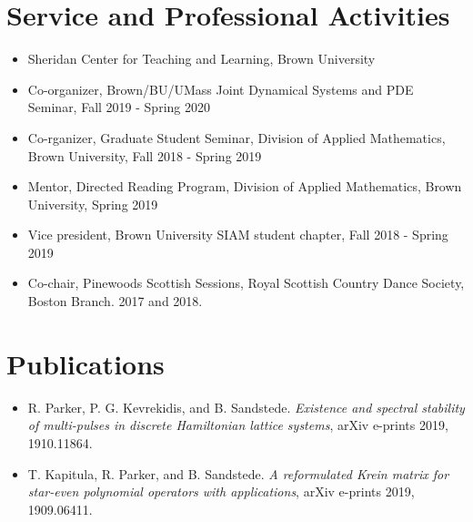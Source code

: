 \section*{Service and Professional Activities}

\begin{itemize}
	\item Sheridan Center for Teaching and Learning, Brown University

	\item Co-organizer, Brown/BU/UMass Joint Dynamical Systems and PDE Seminar, Fall 2019 - Spring 2020

	\item Co-rganizer, Graduate Student Seminar, Division of Applied Mathematics, Brown University, Fall 2018 - Spring 2019

	\item Mentor, Directed Reading Program, Division of Applied Mathematics, Brown University, Spring 2019

	\item Vice president, Brown University SIAM student chapter, Fall 2018 - Spring 2019

	\item Co-chair, Pinewoods Scottish Sessions, Royal Scottish Country Dance Society, Boston Branch. 2017 and 2018. 

\end{itemize}

\section*{Publications}

\begin{itemize}
	\item R. Parker, P. G. Kevrekidis, and B. Sandstede. \textit{Existence and spectral stability of multi-pulses in discrete Hamiltonian lattice systems}, arXiv e-prints 2019, 1910.11864.
	\item T. Kapitula, R. Parker, and B. Sandstede. \textit{A reformulated Krein matrix for star-even polynomial operators with applications}, arXiv e-prints 2019, 1909.06411.
\end{itemize}

